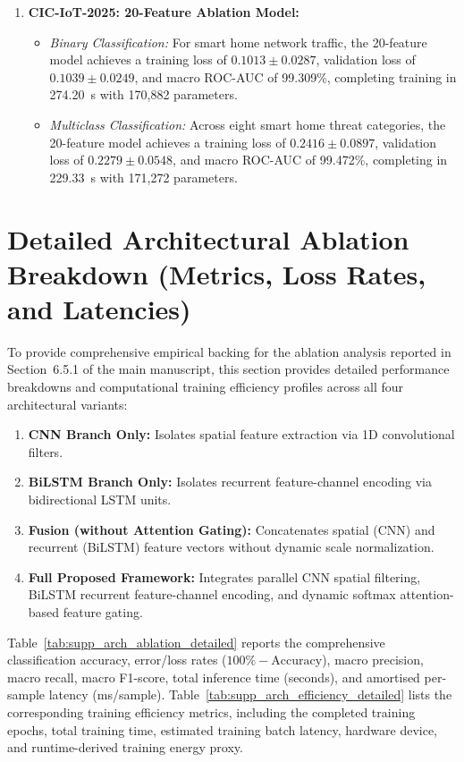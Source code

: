\documentclass[a4paper,fleqn]{cas-sc}
\begin{document}
\begin{enumerate}
    \item \textbf{CIC-IoT-2025: 20-Feature Ablation Model:}
    \begin{itemize}
        \item \textit{Binary Classification:} For smart home network traffic, the 20-feature model achieves a training loss of $0.1013 \pm 0.0287$, validation loss of $0.1039 \pm 0.0249$, and macro ROC-AUC of 99.309\%, completing training in 274.20~s with 170,882 parameters.
        \item \textit{Multiclass Classification:} Across eight smart home threat categories, the 20-feature model achieves a training loss of $0.2416 \pm 0.0897$, validation loss of $0.2279 \pm 0.0548$, and macro ROC-AUC of 99.472\%, completing in 229.33~s with 171,272 parameters.
    \end{itemize}
\end{enumerate}



\section{Detailed Architectural Ablation Breakdown (Metrics, Loss Rates, and Latencies)}
\label{sec:supp_arch_ablation}

To provide comprehensive empirical backing for the ablation analysis reported in Section~6.5.1 of the main manuscript, this section provides detailed performance breakdowns and computational training efficiency profiles across all four architectural variants:
\begin{enumerate}
    \item \textbf{CNN Branch Only:} Isolates spatial feature extraction via 1D convolutional filters.
    \item \textbf{BiLSTM Branch Only:} Isolates recurrent feature-channel encoding via bidirectional LSTM units.
    \item \textbf{Fusion (without Attention Gating):} Concatenates spatial (CNN) and recurrent (BiLSTM) feature vectors without dynamic scale normalization.
    \item \textbf{Full Proposed Framework:} Integrates parallel CNN spatial filtering, BiLSTM recurrent feature-channel encoding, and dynamic softmax attention-based feature gating.
\end{enumerate}

Table~\ref{tab:supp_arch_ablation_detailed} reports the comprehensive classification accuracy, error/loss rates ($100\% - \text{Accuracy}$), macro precision, macro recall, macro F1-score, total inference time (seconds), and amortised per-sample latency (ms/sample). Table~\ref{tab:supp_arch_efficiency_detailed} lists the corresponding training efficiency metrics, including the completed training epochs, total training time, estimated training batch latency, hardware device, and runtime-derived training energy proxy.
\end{document}
